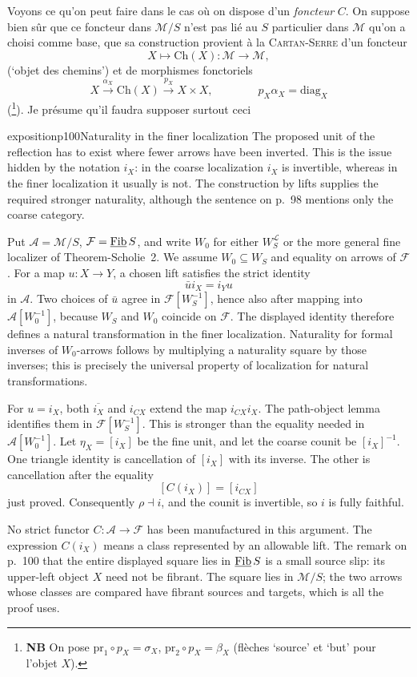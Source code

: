 Voyons ce qu'on peut faire dans le cas où on dispose d'un \textit{foncteur} $C$. On suppose bien sûr que ce foncteur dans $\mathcal{M}/S$  n'est pas lié au $S$ particulier dans $\mathcal{M}$ qu'on a choisi comme base, que sa construction provient à la \textsc{Cartan-Serre} d'un foncteur
\[
X \longmapsto \mathrm{Ch}(X) : \mathcal{M} \longrightarrow \mathcal{M},
\]
(`objet des chemins') et de morphismes fonctoriels
\[
X \xrightarrow{\alpha_X} \mathrm{Ch}(X) \xrightarrow{p_X} X \times X, \qquad\qquad \boxed{p_X\alpha_X = \mathrm{diag}_X}
\]
(\footnote[58]{\textbf{NB} On pose $\mathrm{pr}_1 \circ p_X = \sigma_X$, $\mathrm{pr}_2 \circ p_X = \beta_X$ (flèches `source' et `but' pour l'objet $X$).}). Je présume qu'il faudra supposer surtout ceci

\begin{dcomment}{exposition}{p100}{Naturality in the finer localization}
The proposed unit of the reflection has to exist where fewer arrows have been inverted. This is the issue hidden by the notation $i_X$: in the coarse localization $i_X$ is invertible, whereas in the finer localization it usually is not. The construction by lifts supplies the required stronger naturality, although the sentence on p.~98 mentions only the coarse category.

Put $\mathcal A=\mathcal M/S$, $\mathcal F=\underline{\mathrm{Fib}}\, S$, and write $W_0$ for either $W_S^{\mathcal L}$ or the more general fine localizer of Theorem-Scholie~2. We assume $W_0\subseteq W_S$ and equality on arrows of $\mathcal F$. For a map $u:X\to Y$, a chosen lift satisfies the strict identity
\[
 \bar u i_X=i_Yu
\]
in $\mathcal A$. Two choices of $\bar u$ agree in $\mathcal F[W_S^{-1}]$, hence also after mapping into $\mathcal A[W_0^{-1}]$, because $W_S$ and $W_0$ coincide on $\mathcal F$. The displayed identity therefore defines a natural transformation in the finer localization. Naturality for formal inverses of $W_0$-arrows follows by multiplying a naturality square by those inverses; this is precisely the universal property of localization for natural transformations.

For $u=i_X$, both $\overline{i_X}$ and $i_{CX}$ extend the map $i_{CX}i_X$. The path-object lemma identifies them in $\mathcal F[W_S^{-1}]$. This is stronger than the equality needed in $\mathcal A[W_0^{-1}]$. Let $\eta_X=[i_X]$ be the fine unit, and let the coarse counit be $[i_X]^{-1}$. One triangle identity is cancellation of $[i_X]$ with its inverse. The other is cancellation after the equality
\[
 [C(i_X)]=[i_{CX}]
\]
just proved. Consequently $\rho\dashv i$, and the counit is invertible, so $i$ is fully faithful.

No strict functor $C:\mathcal A\to\mathcal F$ has been manufactured in this argument. The expression $C(i_X)$ means a class represented by an allowable lift. The remark on p.~100 that the entire displayed square lies in $\underline{\mathrm{Fib}}\, S$ is a small source slip: its upper-left object $X$ need not be fibrant. The square lies in $\mathcal M/S$; the two arrows whose classes are compared have fibrant sources and targets, which is all the proof uses.
\end{dcomment}


